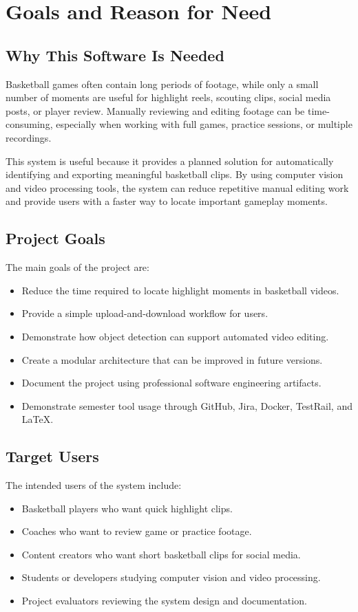 \documentclass[12pt]{article}
\begin{document}
\section{Goals and Reason for Need}

\subsection{Why This Software Is Needed}
Basketball games often contain long periods of footage, while only a small number of moments are useful for highlight reels, scouting clips, social media posts, or player review. Manually reviewing and editing footage can be time-consuming, especially when working with full games, practice sessions, or multiple recordings.

This system is useful because it provides a planned solution for automatically identifying and exporting meaningful basketball clips. By using computer vision and video processing tools, the system can reduce repetitive manual editing work and provide users with a faster way to locate important gameplay moments.

\subsection{Project Goals}
The main goals of the project are:

\begin{itemize}[noitemsep]
    \item Reduce the time required to locate highlight moments in basketball videos.
    \item Provide a simple upload-and-download workflow for users.
    \item Demonstrate how object detection can support automated video editing.
    \item Create a modular architecture that can be improved in future versions.
    \item Document the project using professional software engineering artifacts.
    \item Demonstrate semester tool usage through GitHub, Jira, Docker, TestRail, and LaTeX.
\end{itemize}

\subsection{Target Users}
The intended users of the system include:

\begin{itemize}[noitemsep]
    \item Basketball players who want quick highlight clips.
    \item Coaches who want to review game or practice footage.
    \item Content creators who want short basketball clips for social media.
    \item Students or developers studying computer vision and video processing.
    \item Project evaluators reviewing the system design and documentation.
\end{itemize}
\end{document}
